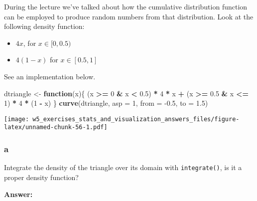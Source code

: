 \documentclass[]{article}
\newenvironment{Shaded}{\begin{snugshade}}{\end{snugshade}}
\newcommand{\ControlFlowTok}[1]{\textcolor[rgb]{0.13,0.29,0.53}{\textbf{#1}}}
\newcommand{\DataTypeTok}[1]{\textcolor[rgb]{0.13,0.29,0.53}{#1}}
\newcommand{\DecValTok}[1]{\textcolor[rgb]{0.00,0.00,0.81}{#1}}
\newcommand{\FloatTok}[1]{\textcolor[rgb]{0.00,0.00,0.81}{#1}}
\newcommand{\KeywordTok}[1]{\textcolor[rgb]{0.13,0.29,0.53}{\textbf{#1}}}
\newcommand{\NormalTok}[1]{#1}
\newcommand{\OperatorTok}[1]{\textcolor[rgb]{0.81,0.36,0.00}{\textbf{#1}}}
\newcommand{\StringTok}[1]{\textcolor[rgb]{0.31,0.60,0.02}{#1}}
\providecommand{\tightlist}{%
  \setlength{\itemsep}{0pt}\setlength{\parskip}{0pt}}
\begin{document}
During the lecture we've talked about how the cumulative distribution
function can be employed to produce random numbers from that
distribution. Look at the following density function:

\begin{itemize}
\tightlist
\item
  \(4x\), for \(x\in [0, 0.5)\)
\item
  \(4(1-x)\) for \(x\in [0.5, 1]\)
\end{itemize}

See an implementation below.

\begin{Shaded}
\begin{Highlighting}[]
\NormalTok{dtriangle <-}\StringTok{ }\ControlFlowTok{function}\NormalTok{(x)\{}
\NormalTok{  (x }\OperatorTok{>=}\StringTok{ }\DecValTok{0} \OperatorTok{&}\StringTok{ }\NormalTok{x }\OperatorTok{<}\StringTok{ }\FloatTok{0.5}\NormalTok{) }\OperatorTok{*}\StringTok{ }\DecValTok{4} \OperatorTok{*}\StringTok{ }\NormalTok{x }\OperatorTok{+}\StringTok{ }\NormalTok{(x }\OperatorTok{>=}\StringTok{ }\FloatTok{0.5} \OperatorTok{&}\StringTok{ }\NormalTok{x }\OperatorTok{<=}\StringTok{ }\DecValTok{1}\NormalTok{) }\OperatorTok{*}\StringTok{ }\DecValTok{4} \OperatorTok{*}\StringTok{ }\NormalTok{(}\DecValTok{1} \OperatorTok{-}\StringTok{ }\NormalTok{x)}
\NormalTok{\}}
\KeywordTok{curve}\NormalTok{(dtriangle, }\DataTypeTok{asp =} \DecValTok{1}\NormalTok{, }\DataTypeTok{from =} \FloatTok{-0.5}\NormalTok{, }\DataTypeTok{to =} \FloatTok{1.5}\NormalTok{)}
\end{Highlighting}
\end{Shaded}

\texttt{[image: w5\_exercises\_stats\_and\_visualization\_answers\_files/figure-latex/unnamed-chunk-56-1.pdf]}

\hypertarget{a-10}{%
\subsubsection{a}\label{a-10}}

Integrate the density of the triangle over its domain with
\texttt{integrate()}, is it a proper density function?

\textbf{Answer:}

\begin{Shaded}
\end{Shaded}
\end{document}
